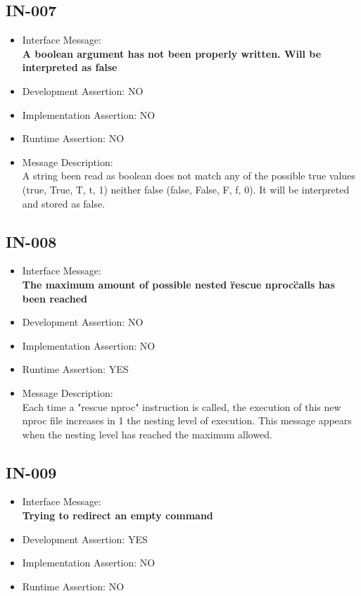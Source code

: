 \subsection{IN-007}
\begin{itemize}
  \item Interface Message:\\[1em]
    \textbf{A boolean argument has not been properly written. Will be interpreted as false}
  \item Development Assertion: NO
  \item Implementation Assertion: NO
  \item Runtime Assertion: NO
  \item Message Description:\\[1em]
    A string been read as boolean does not match any of the possible true values (true, True, T, t, 1) neither false (false, False, F, f, 0). It will be interpreted and stored as false.
\end{itemize}

\subsection{IN-008}
\begin{itemize}
  \item Interface Message:\\[1em]
    \textbf{The maximum amount of possible nested \"rescue nproc\" calls has been reached}
  \item Development Assertion: NO
  \item Implementation Assertion: NO
  \item Runtime Assertion: YES
  \item Message Description:\\[1em]
    Each time a "rescue nproc" instruction is called, the execution of this new nproc file increases in 1 the nesting level of execution. This message appears when the nesting level has reached the maximum allowed.
\end{itemize}

\subsection{IN-009}
\begin{itemize}
  \item Interface Message:\\[1em]
    \textbf{Trying to redirect an empty command}
  \item Development Assertion: YES
  \item Implementation Assertion: NO
  \item Runtime Assertion: NO
\end{itemize}

